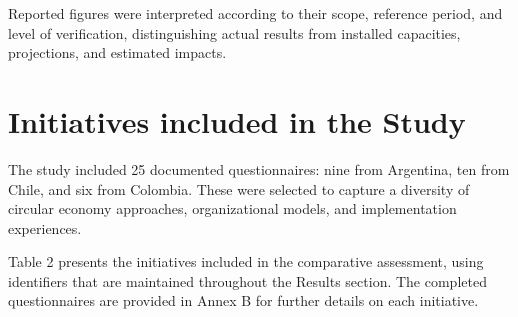 \documentclass[
  12pt,
  oneside]{book}
\begin{document}
Reported figures were interpreted according to their scope, reference
period, and level of verification, distinguishing actual results from
installed capacities, projections, and estimated impacts.

\section{Initiatives included in the
Study}\label{initiatives-included-in-the-study}

The study included 25 documented questionnaires: nine from Argentina,
ten from Chile, and six from Colombia. These were selected to capture a
diversity of circular economy approaches, organizational models, and
implementation experiences.

Table 2 presents the initiatives included in the comparative assessment,
using identifiers that are maintained throughout the Results section.
The completed questionnaires are provided in Annex B for further details
on each initiative.
\end{document}
